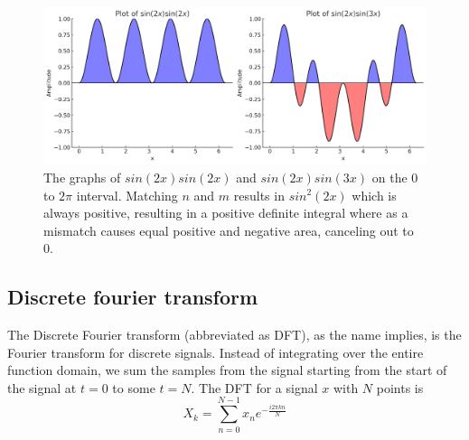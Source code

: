\begin{figure}[ht]
    \centering
    \includegraphics[width=\textwidth]{./images/transformIdea.png}
    \caption{The graphs of $sin(2x)sin(2x)$ and $sin(2x)sin(3x)$ on the $0$ to $2\pi$ interval. Matching $n$ and $m$ results in $sin^2(2x)$ which is always positive, resulting in a positive definite integral where as a mismatch causes equal positive and negative area, canceling out to 0.\label{fig:transformIdea}}
\end{figure}

\subsection{Discrete fourier transform} 
The Discrete Fourier transform (abbreviated as DFT), as the name implies, is the Fourier transform for discrete signals. Instead of integrating over the entire function domain, we sum the samples from the signal starting from the start of the signal at $t=0$ to some $t=N$. The DFT for a signal $x$ with $N$ points is 
$$X_k = \sum_{n=0}^{N-1} x_ne^{-\frac{i2\pi kn}{N}}$$

